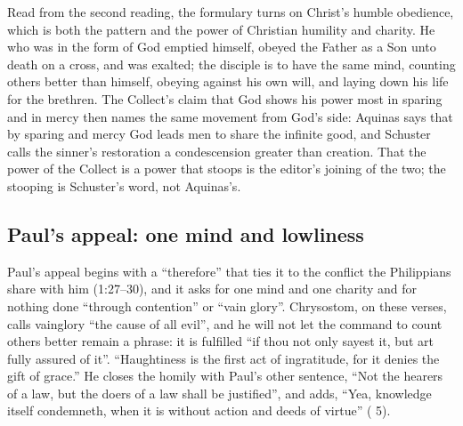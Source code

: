 \label{sec:the-mind-of-christ-jesus}

Read from the second reading, the formulary turns on Christ's humble
obedience, which is both the pattern and the power of Christian humility and
charity.
He who was in the form of God emptied himself, obeyed the Father as a Son unto
death on a cross, and was exalted; the disciple is to have the same mind,
counting others better than himself, obeying against his own will, and laying
down his life for the brethren. The Collect's claim that God shows his power
most in sparing and in mercy then names the same movement from God's side:
Aquinas says that by sparing and mercy God leads men to share the infinite
good, and Schuster calls the sinner's restoration a condescension greater than
creation. That the power of the Collect is a power that stoops is the
editor's joining of the two; the stooping is Schuster's word, not Aquinas's.

\subsection{Paul's appeal: one mind and lowliness}

Paul's appeal begins with a ``therefore'' that ties it to the conflict the
Philippians share with him (1:27--30), and it asks for one mind and one charity
and for nothing done ``through contention'' or ``vain glory''. Chrysostom, on
these verses, calls vainglory ``the cause of all evil'', and he will not let
the command to count others better remain a phrase: it is fulfilled ``if thou
not only sayest it, but art fully assured of it''. ``Haughtiness is the first
act of ingratitude, for it denies the gift of grace.'' He closes the homily
with Paul's other sentence, ``Not the hearers of a law, but the doers of a law
shall be justified'', and adds, ``Yea, knowledge itself condemneth, when it is
without action and deeds of virtue'' ( 5).

